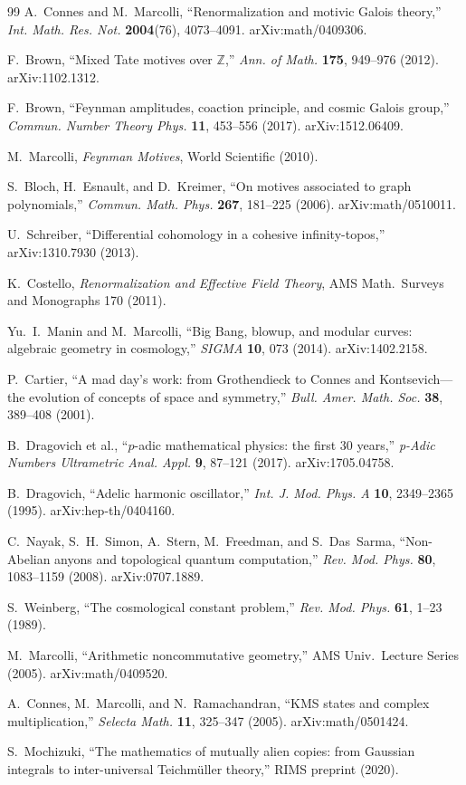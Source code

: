 \documentclass[12pt,a4paper]{ltjsarticle}
\theoremstyle{definition}
\begin{document}
\begin{thebibliography}{99}
A.~Connes and M.~Marcolli, ``Renormalization and motivic Galois theory,'' \textit{Int. Math. Res. Not.} \textbf{2004}(76), 4073--4091. arXiv:math/0409306.

F.~Brown, ``Mixed Tate motives over $\mathbb{Z}$,'' \textit{Ann. of Math.} \textbf{175}, 949--976 (2012). arXiv:1102.1312.

F.~Brown, ``Feynman amplitudes, coaction principle, and cosmic Galois group,'' \textit{Commun. Number Theory Phys.} \textbf{11}, 453--556 (2017). arXiv:1512.06409.

M.~Marcolli, \textit{Feynman Motives}, World Scientific (2010).

S.~Bloch, H.~Esnault, and D.~Kreimer, ``On motives associated to graph polynomials,'' \textit{Commun. Math. Phys.} \textbf{267}, 181--225 (2006). arXiv:math/0510011.

U.~Schreiber, ``Differential cohomology in a cohesive infinity-topos,'' arXiv:1310.7930 (2013).

K.~Costello, \textit{Renormalization and Effective Field Theory}, AMS Math.~Surveys and Monographs 170 (2011).

Yu.~I.~Manin and M.~Marcolli, ``Big Bang, blowup, and modular curves: algebraic geometry in cosmology,'' \textit{SIGMA} \textbf{10}, 073 (2014). arXiv:1402.2158.

P.~Cartier, ``A mad day's work: from Grothendieck to Connes and Kontsevich---the evolution of concepts of space and symmetry,'' \textit{Bull. Amer. Math. Soc.} \textbf{38}, 389--408 (2001).

B.~Dragovich et al., ``$p$-adic mathematical physics: the first 30 years,'' \textit{p-Adic Numbers Ultrametric Anal. Appl.} \textbf{9}, 87--121 (2017). arXiv:1705.04758.

B.~Dragovich, ``Adelic harmonic oscillator,'' \textit{Int. J. Mod. Phys. A} \textbf{10}, 2349--2365 (1995). arXiv:hep-th/0404160.

C.~Nayak, S.~H.~Simon, A.~Stern, M.~Freedman, and S.~Das~Sarma, ``Non-Abelian anyons and topological quantum computation,'' \textit{Rev. Mod. Phys.} \textbf{80}, 1083--1159 (2008). arXiv:0707.1889.

S.~Weinberg, ``The cosmological constant problem,'' \textit{Rev. Mod. Phys.} \textbf{61}, 1--23 (1989).

M.~Marcolli, ``Arithmetic noncommutative geometry,'' AMS Univ.~Lecture Series (2005). arXiv:math/0409520.

A.~Connes, M.~Marcolli, and N.~Ramachandran, ``KMS states and complex multiplication,'' \textit{Selecta Math.} \textbf{11}, 325--347 (2005). arXiv:math/0501424.

S.~Mochizuki, ``The mathematics of mutually alien copies: from Gaussian integrals to inter-universal Teichm\"{u}ller theory,'' RIMS preprint (2020).

\end{thebibliography}
\end{document}
